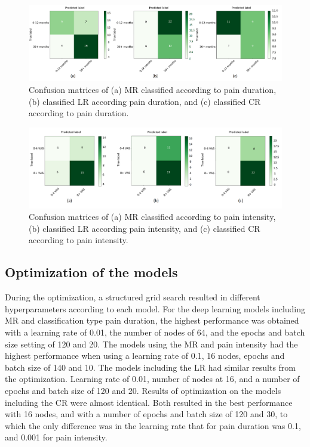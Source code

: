 \begin{figure} [b!]
\begin{tcolorbox}[colframe=black!30!black, colback=white]
    \includegraphics[width=1\textwidth]{Figures/samcon}
  \caption{Confusion matrices of (a) MR classified according to pain duration, (b) classified LR according pain duration, and (c) classified CR according to pain duration.}
  \label{fig:confma}
\end{tcolorbox}
\end{figure}

\begin{figure} [t!]
\begin{tcolorbox}[colframe=black!30!black, colback=white]
    \includegraphics[width=1\textwidth]{Figures/samcon1}
  \caption{Confusion matrices of (a) MR classified according to pain intensity, (b) classified LR according pain intensity, and (c) classified CR according to pain intensity.}
  \label{fig:confma1}
\end{tcolorbox}
\end{figure}

\subsection{Optimization of the models}
During the optimization, a structured grid search resulted in different hyperparameters according to each model. For the deep learning models including MR and classification type pain duration, the highest performance was obtained with a learning rate of 0.01, the number of nodes of 64, and the epochs and batch size setting of 120 and 20. The models using the MR and pain intensity had the highest performance when using a learning rate of 0.1, 16 nodes, epochs and batch size of 140 and 10. The models including the LR had similar results from the optimization. Learning rate of 0.01, number of nodes at 16, and a number of epochs and batch size of 120 and 20. 
Results of optimization on the models including the CR were almost identical. Both resulted in the best performance with 16 nodes, and with a number of epochs and batch size of 120 and 30, to which the only difference was in the learning rate that for pain duration was 0.1, and 0.001 for pain intensity.

